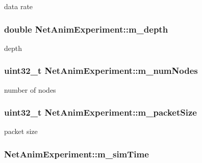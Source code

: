 data rate 

\subsubsection[{\texorpdfstring{m\+\_\+depth}{m_depth}}]{\setlength{\rightskip}{0pt plus 5cm}double Net\+Anim\+Experiment\+::m\+\_\+depth}\hypertarget{classNetAnimExperiment_a6b6f1fbd47ec60dd032ae97f8962dea1}{}\label{classNetAnimExperiment_a6b6f1fbd47ec60dd032ae97f8962dea1}


depth 

\subsubsection[{\texorpdfstring{m\+\_\+num\+Nodes}{m_numNodes}}]{\setlength{\rightskip}{0pt plus 5cm}uint32\+\_\+t Net\+Anim\+Experiment\+::m\+\_\+num\+Nodes}\hypertarget{classNetAnimExperiment_a829363fc981b850401bc71674534c447}{}\label{classNetAnimExperiment_a829363fc981b850401bc71674534c447}


number of nodes 

\subsubsection[{\texorpdfstring{m\+\_\+packet\+Size}{m_packetSize}}]{\setlength{\rightskip}{0pt plus 5cm}uint32\+\_\+t Net\+Anim\+Experiment\+::m\+\_\+packet\+Size}\hypertarget{classNetAnimExperiment_a8fa7c7d678fb0721374708aad5537510}{}\label{classNetAnimExperiment_a8fa7c7d678fb0721374708aad5537510}


packet size 

\subsubsection[{\texorpdfstring{m\+\_\+sim\+Time}{m_simTime}}]{ Net\+Anim\+Experiment\+::m\+\_\+sim\+Time}\hypertarget{classNetAnimExperiment_a647b3bc58c546fceefa722338e49db0a}{}\label{classNetAnimExperiment_a647b3bc58c546fceefa722338e49db0a}


